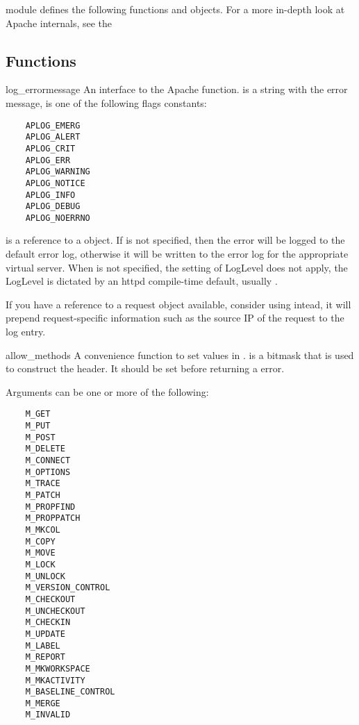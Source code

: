  module defines the following functions and
objects. For a more in-depth look at Apache internals, see the

\subsection{Functions\label{pyapi-apmeth}}

\begin{funcdesc}{log_error}{message}
  An interface to the Apache 
  function.  is a string with the error message,
   is one of the following flags constants:

  \begin{verbatim}
    APLOG_EMERG
    APLOG_ALERT
    APLOG_CRIT
    APLOG_ERR
    APLOG_WARNING
    APLOG_NOTICE
    APLOG_INFO
    APLOG_DEBUG
    APLOG_NOERRNO
  \end{verbatim}            
  
   is a reference to a  object. If
   is not specified, then the error will be logged to the
  default error log, otherwise it will be written to the error log for
  the appropriate virtual server. When  is not specified,
  the setting of LogLevel does not apply, the LogLevel is dictated by
  an httpd compile-time default, usually .

  If you have a reference to a request object available, consider using
   intead, it will prepend request-specific
  information such as the source IP of the request to the log entry.
\end{funcdesc}

\begin{funcdesc}{allow_methods}{}
  A convenience function to set values in .
   is a bitmask that is used to construct the
   header. It should be set before returning a
   error.

  Arguments can be one or more of the following:
  \begin{verbatim}
    M_GET
    M_PUT
    M_POST
    M_DELETE
    M_CONNECT
    M_OPTIONS
    M_TRACE
    M_PATCH
    M_PROPFIND
    M_PROPPATCH
    M_MKCOL
    M_COPY
    M_MOVE
    M_LOCK
    M_UNLOCK
    M_VERSION_CONTROL
    M_CHECKOUT
    M_UNCHECKOUT
    M_CHECKIN
    M_UPDATE
    M_LABEL
    M_REPORT
    M_MKWORKSPACE
    M_MKACTIVITY
    M_BASELINE_CONTROL
    M_MERGE
    M_INVALID
  \end{verbatim}

\end{funcdesc}


